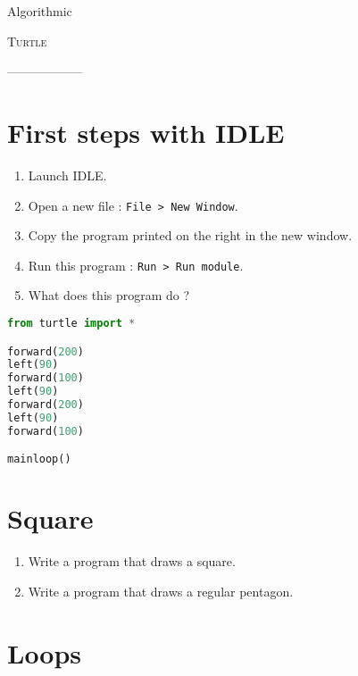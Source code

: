 \documentclass[12pt]{article}
\begin{document}
\begin{center}
  Algorithmic

  {\large
    \textsc{Turtle}
  }

  ------------------
\end{center}

\section{First steps with IDLE}

\begin{multicols}{2}
\begin{enumerate}
  \item Launch IDLE.
  \item Open a new file : \texttt{File > New Window}.
  \item Copy the program printed on the right in the new window.
  \item Run this program : \texttt{Run > Run module}.
  \item What does this program do ?
\end{enumerate}

\columnbreak

\begin{lstlisting}[language=python,frame=single]
from turtle import *

forward(200)
left(90)
forward(100)
left(90)
forward(200)
left(90)
forward(100)

mainloop()
\end{lstlisting}

\end{multicols}

\section{Square}

\begin{enumerate}
  \item Write a program that draws a square.
  \item Write a program that draws a regular pentagon.
\end{enumerate}

\section{Loops}
\end{document}
